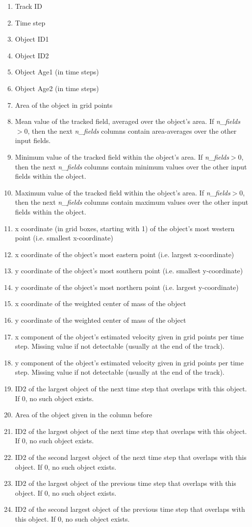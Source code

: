\documentclass[11pt]{article}
\begin{document}
\begin{enumerate}
\item Track ID
\item Time step
\item Object ID1
\item Object ID2
\item Object Age1 (in time steps)
\item Object Age2 (in time steps)
\item Area of the object in grid points
\item Mean value of the tracked field, averaged over the object's area. If {\it n\_fields}$>0$, then the next {\it n\_fields} columns contain area-averages over the other input fields.
\item Minimum value of the tracked field within the object's area. If {\it n\_fields}$>0$, then the next {\it n\_fields} columns contain minimum values over the other input fields within the object.
\item Maximum value of the tracked field within the object's area. If {\it n\_fields}$>0$, then the next {\it n\_fields} columns contain maximum values over the other input fields within the object.
\item x coordinate (in grid boxes, starting with 1) of the object's most western point (i.e. smallest x-coordinate)
\item x coordinate of the object's most eastern point (i.e. largest x-coordinate)
\item y coordinate of the object's most southern point (i.e. smallest y-coordinate)
\item y coordinate of the object's most northern point (i.e. largest y-coordinate)
\item x coordinate of the weighted center of mass of the object
\item y coordinate of the weighted center of mass of the object
\item x component of the object's estimated velocity given in grid points per time step. Missing value if not detectable (usually at the end of the track).
\item y component of the object's estimated velocity given in grid points per time step. Missing value if not detectable (usually at the end of the track).
\item ID2 of the largest object of the next time step that overlaps with this object. If 0, no such object exists.
\item Area of the object given in the column before
\item ID2 of the largest object of the next time step that overlaps with this object. If 0, no such object exists.
\item ID2 of the second largest object of the next time step that overlaps with this object. If 0, no such object exists.
\item ID2 of the largest object of the previous time step that overlaps with this object. If 0, no such object exists.
\item ID2 of the second largest object of the previous time step that overlaps with this object. If 0, no such object exists.
\end{enumerate}\vspace{0.5cm}
\end{document}
